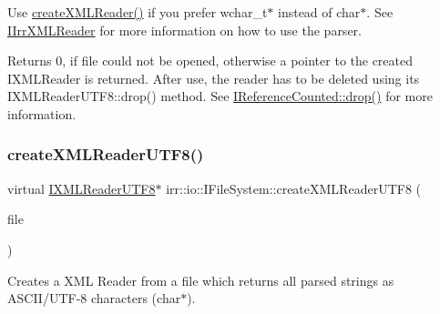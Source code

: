 Use \hyperlink{classirr_1_1io_1_1IFileSystem_a167c9fa159d16ee5c56c074636b0865e}{create\+X\+M\+L\+Reader()} if you prefer wchar\+\_\+t$\ast$ instead of char$\ast$. See \hyperlink{classirr_1_1io_1_1IIrrXMLReader}{I\+Irr\+X\+M\+L\+Reader} for more information on how to use the parser. \begin{DoxyReturn}{Returns}
0, if file could not be opened, otherwise a pointer to the created I\+X\+M\+L\+Reader is returned. After use, the reader has to be deleted using its I\+X\+M\+L\+Reader\+U\+T\+F8\+::drop() method. See \hyperlink{classirr_1_1IReferenceCounted_a03856a09355b89d178090c4a5f738543}{I\+Reference\+Counted\+::drop()} for more information. 
\end{DoxyReturn}
\mbox{\label{classirr_1_1io_1_1IFileSystem_acda42a761d3b2fb4d39ad1d9e2ada973}} 
\subsubsection{\texorpdfstring{create\+X\+M\+L\+Reader\+U\+T\+F8()}{createXMLReaderUTF8()}\hspace{0.1cm}{\footnotesize\ttfamily [4/4]}}
{\footnotesize\ttfamily virtual \hyperlink{namespaceirr_1_1io_a87616ca0bcc3d6424d2c2edfcb743193}{I\+X\+M\+L\+Reader\+U\+T\+F8}$\ast$ irr\+::io\+::\+I\+File\+System\+::create\+X\+M\+L\+Reader\+U\+T\+F8 (\begin{DoxyParamCaption}\item[{\hyperlink{classirr_1_1io_1_1IReadFile}{I\+Read\+File} $\ast$}]{file }\end{DoxyParamCaption})\hspace{0.3cm}{\ttfamily [pure virtual]}}



Creates a X\+ML Reader from a file which returns all parsed strings as A\+S\+C\+I\+I/\+U\+T\+F-\/8 characters (char$\ast$). 

